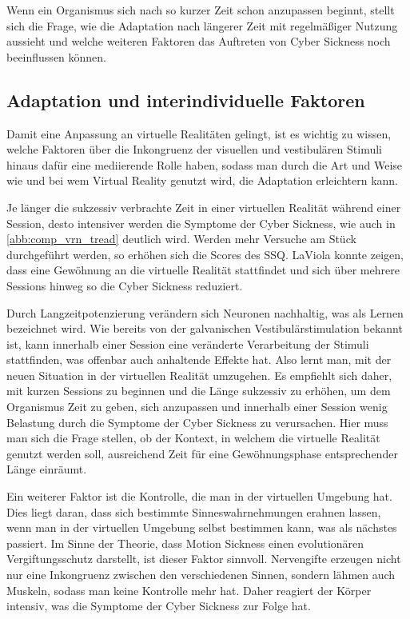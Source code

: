 Wenn ein Organismus sich nach so kurzer Zeit schon anzupassen beginnt, stellt sich die Frage, wie die Adaptation nach l\"angerer Zeit mit regelm\"a{\ss}iger Nutzung aussieht und welche weiteren Faktoren das Auftreten von Cyber Sickness noch beeinflussen k\"onnen.

\subsection{Adaptation und interindividuelle Faktoren}\label{Adaptation}

Damit eine Anpassung an virtuelle Realit\"aten gelingt, ist es wichtig zu wissen, welche Faktoren \"uber die Inkongruenz der visuellen und vestibul\"aren Stimuli hinaus daf\"ur eine mediierende Rolle haben, sodass man durch die Art und Weise wie und bei wem Virtual Reality genutzt wird, die Adaptation erleichtern kann.

Je l\"anger die sukzessiv verbrachte Zeit in einer virtuellen Realit\"at w\"ahrend einer Session, desto intensiver werden die Symptome der Cyber Sickness\cite{Aldaba:2017:VRNTreadGraphic}, wie auch in \autoref{abb:comp_vrn_tread} deutlich wird. Werden mehr Versuche am St\"uck durchgef\"uhrt werden, so erh\"ohen sich die Scores des SSQ. LaViola\cite{LaViola:2000:CSinVR} konnte zeigen, dass eine Gew\"ohnung an die virtuelle Realität stattfindet und sich \"uber mehrere Sessions hinweg so die Cyber Sickness reduziert.

Durch Langzeitpotenzierung ver\"andern sich Neuronen nachhaltig, was als Lernen bezeichnet wird. 
Wie bereits von der galvanischen Vestibul\"arstimulation bekannt ist, kann innerhalb einer Session eine ver\"anderte Verarbeitung der Stimuli stattfinden, was offenbar auch anhaltende Effekte hat. Also lernt man, mit der neuen Situation in der virtuellen Realit\"at umzugehen.
Es empfiehlt sich daher, mit kurzen Sessions zu beginnen und die L\"ange sukzessiv zu erh\"ohen, um dem Organismus Zeit zu geben, sich anzupassen und innerhalb einer Session wenig Belastung durch die Symptome der Cyber Sickness zu verursachen.
Hier muss man sich die Frage stellen, ob der Kontext, in welchem die virtuelle Realit\"at genutzt werden soll, ausreichend Zeit f\"ur eine Gew\"ohnungsphase entsprechender Länge einr\"aumt.

Ein weiterer Faktor ist die Kontrolle, die man in der virtuellen Umgebung hat\cite{Kolasinski:1995:control}. Dies liegt daran, dass sich bestimmte Sinneswahrnehmungen erahnen lassen, wenn man in der virtuellen Umgebung selbst bestimmen kann, was als n\"achstes passiert. Im Sinne der Theorie, dass Motion Sickness einen evolution\"aren Vergiftungsschutz darstellt, ist dieser Faktor sinnvoll. Nervengifte erzeugen nicht nur eine Inkongruenz zwischen den verschiedenen Sinnen, sondern l\"ahmen auch Muskeln, sodass man keine Kontrolle mehr hat. Daher reagiert der K\"orper intensiv, was die Symptome der Cyber Sickness zur Folge hat.

